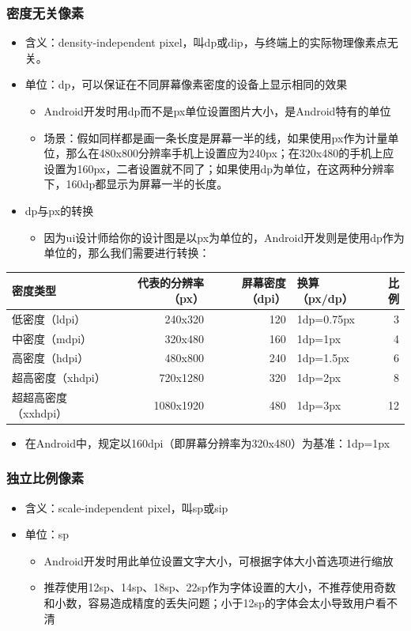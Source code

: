 \documentclass[9pt, b5paper]{article}
\begin{document}
\subsubsection{密度无关像素}
\label{sec-1-4-4}
\begin{itemize}
\item 含义：density-independent pixel，叫dp或dip，与终端上的实际物理像素点无关。
\item 单位：dp，可以保证在不同屏幕像素密度的设备上显示相同的效果
\begin{itemize}
\item Android开发时用dp而不是px单位设置图片大小，是Android特有的单位
\item 场景：假如同样都是画一条长度是屏幕一半的线，如果使用px作为计量单位，那么在480x800分辨率手机上设置应为240px；在320x480的手机上应设置为160px，二者设置就不同了；如果使用dp为单位，在这两种分辨率下，160dp都显示为屏幕一半的长度。
\end{itemize}
\item dp与px的转换
\begin{itemize}
\item 因为ui设计师给你的设计图是以px为单位的，Android开发则是使用dp作为单位的，那么我们需要进行转换：
\end{itemize}
\end{itemize}
\begin{center}
\begin{tabular}{lrrlr}
\hline
密度类型 & 代表的分辨率（px） & 屏幕密度（dpi） & 换算（px/dp） & 比例\\
\hline
低密度（ldpi） & 240x320 & 120 & 1dp=0.75px & 3\\
中密度（mdpi） & 320x480 & 160 & 1dp=1px & 4\\
高密度（hdpi） & 480x800 & 240 & 1dp=1.5px & 6\\
超高密度（xhdpi） & 720x1280 & 320 & 1dp=2px & 8\\
超超高密度（xxhdpi） & 1080x1920 & 480 & 1dp=3px & 12\\
\hline
\end{tabular}
\end{center}
\begin{itemize}
\item 在Android中，规定以160dpi（即屏幕分辨率为320x480）为基准：1dp=1px
\end{itemize}

\subsubsection{独立比例像素}
\label{sec-1-4-5}
\begin{itemize}
\item 含义：scale-independent pixel，叫sp或sip
\item 单位：sp
\begin{itemize}
\item Android开发时用此单位设置文字大小，可根据字体大小首选项进行缩放
\item 推荐使用12sp、14sp、18sp、22sp作为字体设置的大小，不推荐使用奇数和小数，容易造成精度的丢失问题；小于12sp的字体会太小导致用户看不清
\end{itemize}
\end{itemize}
\end{document}
